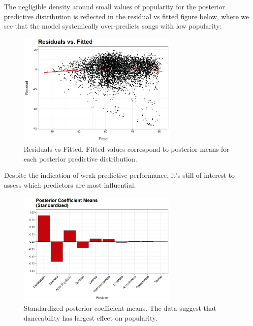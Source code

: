 \documentclass[12pt, twoside]{article}
\begin{document}
The negligible density around small values of popularity for the posterior predictive distribution is reflected in the residual vs fitted figure below, where we see that the model systemically over-predicts songs with low popularity:

\begin{figure}[H] %
\centering
\includegraphics[width=0.7\textwidth]{residuals.png} %
\caption{Residuals vs Fitted. Fitted values correspond to posterior means for each posterior predictive distribution.}
\label{fig:residuals} %
\end{figure}

Despite the indication of weak predictive performance, it's still of interest to assess which predictors are most influential. 

\begin{figure}[H] %
\centering
\includegraphics[width=0.7\textwidth]{standardized_coeffs.png} %
\caption{Standardized posterior coefficient means. The data suggest that danceability has largest effect on popularity.}
\label{fig:standardized_coefs} %
\end{figure}
\end{document}
